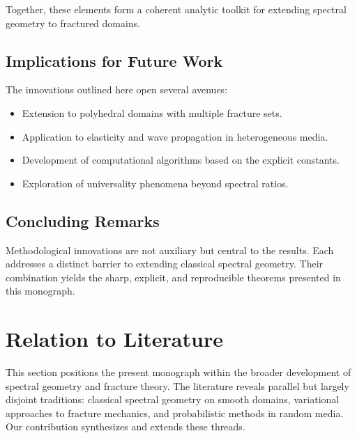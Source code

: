 Together, these elements form a coherent analytic toolkit for extending spectral
geometry to fractured domains.

\subsection{Implications for Future Work}

The innovations outlined here open several avenues:

\begin{itemize}
  \item Extension to polyhedral domains with multiple fracture sets.
  \item Application to elasticity and wave propagation in heterogeneous media.
  \item Development of computational algorithms based on the explicit constants.
  \item Exploration of universality phenomena beyond spectral ratios.
\end{itemize}

\subsection{Concluding Remarks}

Methodological innovations are not auxiliary but central to the results. Each
addresses a distinct barrier to extending classical spectral geometry. Their
combination yields the sharp, explicit, and reproducible theorems presented in
this monograph.


\section{Relation to Literature}

This section positions the present monograph within the broader development of
spectral geometry and fracture theory. The literature reveals parallel but
largely disjoint traditions: classical spectral geometry on smooth domains,
variational approaches to fracture mechanics, and probabilistic methods in
random media. Our contribution synthesizes and extends these threads.

